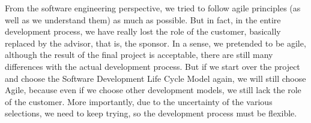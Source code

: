 From the software engineering perspective, we tried to follow agile principles (as well as we understand them) as much as possible. But in fact, in the entire development process, we have really lost the role of the customer, basically replaced by the advisor, that is, the sponsor. In a sense, we pretended to be agile, although the result of the final project is acceptable, there are still many differences with the actual development process. But if we start over the project and choose the Software Development Life Cycle Model again, we will still choose Agile, because even if we choose other development models, we still lack the role of the customer. More importantly, due to the uncertainty of the various selections, we need to keep trying, so the development process must be flexible.

